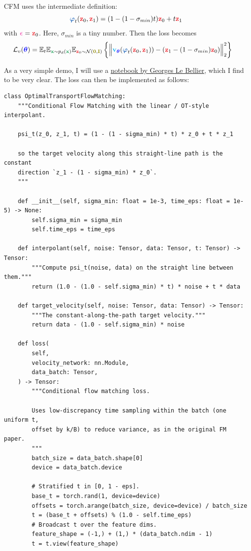 \documentclass[usenames,dvipsnames]{article}
\DeclarePairedDelimiter{\norm}{\lVert}{\rVert}
\newcommand{\myvec}[1]{\mathbf{#1}}
\newcommand{\myvecsym}[1]{\boldsymbol{#1}}
\newcommand{\vx}{\myvec{\textcolor{ForestGreen}{x}}}
\newcommand{\vz}{\myvec{\textcolor{Red}{z}}}
\newcommand{\vv}{\myvec{\textcolor{Cyan}{v}}}
\newcommand{\vzero}{\myvec{\textcolor{olive}{0}}}
\newcommand{\vI}{\myvec{\textcolor{olive}{I}}}
\newcommand{\vvarphi}{\myvecsym{\textcolor{NavyBlue}{\varphi}}}
\newcommand{\vtheta}{\myvecsym{\textcolor{blue}{\theta}}}
\newcommand{\vepsilon}{\myvecsym{\textcolor{CarnationPink}{\epsilon}}}
\newcommand{\loss}{{\cal L}}
\newcommand{\gauss}{\mathcal{N}}
\newcommand{\E}{\mathbb{E}} %
\newcommand{\be}{\begin{equation}}
\newcommand{\ee}{\end{equation}}
\begin{document}
CFM uses the intermediate definition:
\be
\vvarphi_t (\vz_0, \vz_1) = (1 - (1 - \sigma_{min})t)\vz_0 + t \vz_1
\ee
with $\vepsilon = \vz_{0}$. Here, $\sigma_{min}$ is a tiny number. Then the loss becomes
\begin{align}
  \loss_{v}(\vtheta)
&= \E_{t}
 \E_{\vx \sim p_d(\vx)}
 \E_{\vz_0 \sim \gauss(\vzero,\vI)}
 \left\{  
 \norm[\Big]{\vv_{\vtheta}(\vvarphi_t (\vz_0, \vz_1))
   -  (\vz_1 - (1 - \sigma_{min})\vz_0 )
   }_2^2
   \right\}
\nonumber
\end{align}

As a very simple demo, I will use a \href{https://github.com/lebellig/flow-matching}{notebook by Georges Le Bellier}, which I find to be very clear. The loss can then be implemented as follows:

\begin{verbatim}
class OptimalTransportFlowMatching:
    """Conditional Flow Matching with the linear / OT-style interpolant.

    psi_t(z_0, z_1, t) = (1 - (1 - sigma_min) * t) * z_0 + t * z_1

    so the target velocity along this straight-line path is the constant
    direction `z_1 - (1 - sigma_min) * z_0`.
    """

    def __init__(self, sigma_min: float = 1e-3, time_eps: float = 1e-5) -> None:
        self.sigma_min = sigma_min
        self.time_eps = time_eps

    def interpolant(self, noise: Tensor, data: Tensor, t: Tensor) -> Tensor:
        """Compute psi_t(noise, data) on the straight line between them."""
        return (1.0 - (1.0 - self.sigma_min) * t) * noise + t * data

    def target_velocity(self, noise: Tensor, data: Tensor) -> Tensor:
        """The constant-along-the-path target velocity."""
        return data - (1.0 - self.sigma_min) * noise

    def loss(
        self,
        velocity_network: nn.Module,
        data_batch: Tensor,
    ) -> Tensor:
        """Conditional flow matching loss.

        Uses low-discrepancy time sampling within the batch (one uniform t,
        offset by k/B) to reduce variance, as in the original FM paper.
        """
        batch_size = data_batch.shape[0]
        device = data_batch.device

        # Stratified t in [0, 1 - eps].
        base_t = torch.rand(1, device=device)
        offsets = torch.arange(batch_size, device=device) / batch_size
        t = (base_t + offsets) % (1.0 - self.time_eps)
        # Broadcast t over the feature dims.
        feature_shape = (-1,) + (1,) * (data_batch.ndim - 1)
        t = t.view(feature_shape)


\end{verbatim}
\end{document}
